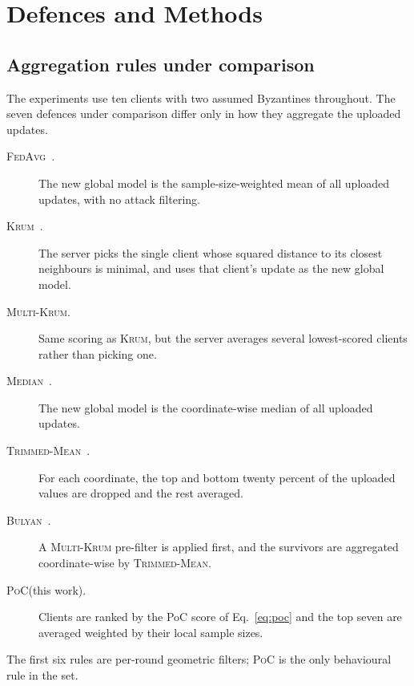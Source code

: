 \documentclass[runningheads]{llncs}
\newcommand{\fedavg}{\textsc{FedAvg}\xspace}
\newcommand{\krum}{\textsc{Krum}\xspace}
\newcommand{\mkrum}{\textsc{Multi-Krum}\xspace}
\newcommand{\median}{\textsc{Median}\xspace}
\newcommand{\tmean}{\textsc{Trimmed-Mean}\xspace}
\newcommand{\bulyan}{\textsc{Bulyan}\xspace}
\newcommand{\poc}{\textsc{PoC}\xspace}
\begin{document}
\section{Defences and Methods}
\label{sec:methods}

\subsection{Aggregation rules under comparison}
\label{subsec:defences}
The experiments use ten clients with two assumed Byzantines
throughout. The seven defences under comparison differ only in how
they aggregate the uploaded updates.
\begin{description}
\item[\fedavg~\cite{mcmahan2017fedavg}.] The new global model is the
sample-size-weighted mean of all uploaded updates, with no attack
filtering.
\item[\krum~\cite{blanchard2017krum}.] The server picks the single
client whose squared distance to its closest neighbours is minimal,
and uses that client's update as the new global model.
\item[\mkrum.] Same scoring as \krum, but the server averages
several lowest-scored clients rather than picking one.
\item[\median~\cite{yin2018byzantine}.] The new global model is the
coordinate-wise median of all uploaded updates.
\item[\tmean~\cite{yin2018byzantine}.] For each coordinate, the top
and bottom twenty percent of the uploaded values are dropped and the
rest averaged.
\item[\bulyan~\cite{elmhamdi2018bulyan}.] A \mkrum pre-filter is
applied first, and the survivors are aggregated coordinate-wise by
\tmean.
\item[\poc (this work).] Clients are ranked by the PoC score of
Eq.~\eqref{eq:poc} and the top seven are averaged weighted by their
local sample sizes.
\end{description}
The first six rules are per-round geometric filters; \poc is the only
behavioural rule in the set.
\end{document}
